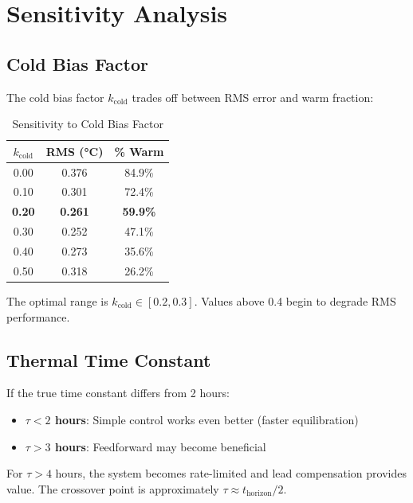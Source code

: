 \documentclass[11pt,letterpaper]{article}
\begin{document}
\section{Sensitivity Analysis}

\subsection{Cold Bias Factor}

The cold bias factor $k_{\text{cold}}$ trades off between RMS error and warm fraction:

\begin{table}[h]
\centering
\caption{Sensitivity to Cold Bias Factor}
\begin{tabular}{ccc}
\toprule
$k_{\text{cold}}$ & RMS (°C) & \% Warm \\
\midrule
0.00 & 0.376 & 84.9\% \\
0.10 & 0.301 & 72.4\% \\
\textbf{0.20} & \textbf{0.261} & \textbf{59.9\%} \\
0.30 & 0.252 & 47.1\% \\
0.40 & 0.273 & 35.6\% \\
0.50 & 0.318 & 26.2\% \\
\bottomrule
\end{tabular}
\label{tab:sensitivity}
\end{table}

The optimal range is $k_{\text{cold}} \in [0.2, 0.3]$. Values above 0.4 begin to degrade RMS performance.

\subsection{Thermal Time Constant}

If the true time constant differs from 2 hours:

\begin{itemize}
    \item \textbf{$\tau < 2$ hours}: Simple control works even better (faster equilibration)
    \item \textbf{$\tau > 3$ hours}: Feedforward may become beneficial
\end{itemize}

For $\tau > 4$ hours, the system becomes rate-limited and lead compensation provides value. The crossover point is approximately $\tau \approx t_{\text{horizon}} / 2$.
\end{document}
